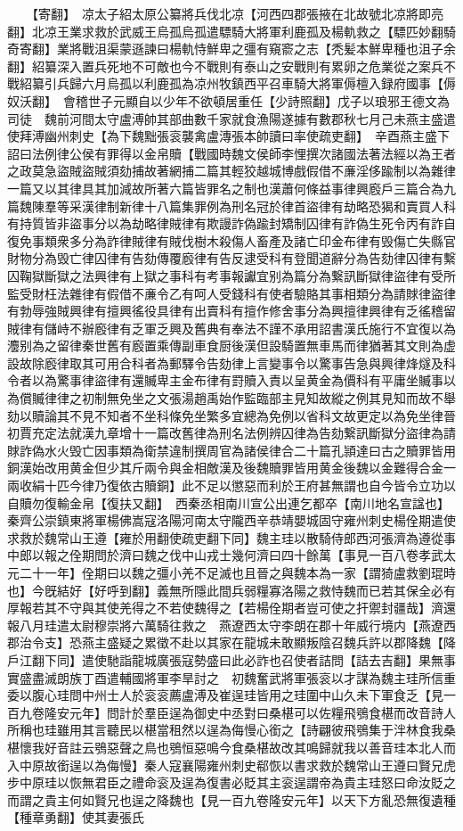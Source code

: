 　　【寄翻】　凉太子紹太原公纂將兵伐北凉【河西四郡張掖在北故號北凉將即亮翻】北凉王業求救於武威王烏孤烏孤遣驃騎大將軍利鹿孤及楊軌救之【驃匹妙翻騎奇寄翻】業將戰沮渠蒙遜諫曰楊軌恃鮮卑之彊有窺窬之志【秃髪本鮮卑種也沮子余翻】紹纂深入置兵死地不可敵也今不戰則有泰山之安戰則有累卵之危業從之案兵不戰紹纂引兵歸六月烏孤以利鹿孤為凉州牧鎮西平召車騎大將軍傉檀入録府國事【傉奴沃翻】　會稽世子元顯自以少年不欲頓居重任【少詩照翻】戊子以琅邪王德文為司徒　魏前河間太守盧溥帥其部曲數千家就食漁陽遂據有數郡秋七月己未燕主盛遣使拜溥幽州刺史【為下魏黜張衮襲禽盧漙張本帥讀曰率使疏吏翻】　辛酉燕主盛下詔曰法例律公侯有罪得以金帛贖【戰國時魏文侯師李悝撰次諸國法著法經以為王者之政莫急盜賊盜賊須劾捕故著網捕二篇其輕狡越城博戲假借不亷淫侈踰制以為雜律一篇又以其律具其加減故所著六篇皆罪名之制也漢蕭何條益事律興廏戶三篇合為九篇魏陳羣等采漢律制新律十八篇集罪例為刑名冠於律首盜律有劫略恐猲和賣買人科有持質皆非盜事分以為劫略律賊律有欺謾詐偽踰封矯制囚律有詐偽生死令丙有詐自復免事類衆多分為詐律賊律有賊伐樹木殺傷人畜產及諸亡印金布律有毁傷亡失縣官財物分為毁亡律囚律有告劾傳覆廏律有告反逮受科有登聞道辭分為告劾律囚律有繫囚鞠獄斷獄之法興律有上獄之事科有考事報讞宜别為篇分為繋訊斷獄律盜律有受所監受財枉法雜律有假借不亷令乙有呵人受錢科有使者驗賂其事相類分為請賕律盜律有勃辱強賊興律有擅興徭役具律有出賣科有擅作修舍事分為興擅律興律有乏徭稽留賊律有儲峙不辦廏律有乏軍乏興及舊典有奉法不謹不承用詔書漢氏施行不宜復以為灋别為之留律秦世舊有廏置乘傳副車食厨後漢但設騎置無車馬而律猶著其文則為虚設故除廏律取其可用合科者為郵驛令告劾律上言變事令以驚事告急與興律烽燧及科令者以為驚事律盜律有還贓卑主金布律有罸贖入責以呈黄金為價科有平庸坐贓事以為償贓律律之初制無免坐之文張湯趙禹始作監臨部主見知故縱之例其見知而故不舉劾以贖論其不見不知者不坐科條免坐繁多宜總為免例以省科文故更定以為免坐律晉初賈充定法就漢九章增十一篇改舊律為刑名法例辨囚律為告劾繋訊斷獄分盜律為請賕詐偽水火毁亡因事類為衛禁違制撰周官為諸侯律合二十篇孔頴達曰古之贖罪皆用銅漢始改用黄金但少其斤兩令與金相敵漢及後魏贖罪皆用黄金後魏以金難得合金一兩收絹十匹今律乃復依古贖銅】此不足以懲惡而利於王府甚無謂也自今皆令立功以自贖勿復輸金帛【復扶又翻】　西秦丞相南川宣公出連乞都卒【南川地名宣諡也】　秦齊公崇鎮東將軍楊佛嵩寇洛陽河南太守隴西辛恭靖嬰城固守雍州刺史楊佺期遣使求救於魏常山王遵【雍於用翻使疏吏翻下同】魏主珪以散騎侍郎西河張濟為遵從事中郎以報之佺期問於濟曰魏之伐中山戎士幾何濟曰四十餘萬【事見一百八卷孝武太元二十一年】佺期曰以魏之彊小羌不足滅也且晉之與魏本為一家【謂猗盧救劉琨時也】今旣結好【好呼到翻】義無所隱此間兵弱糧寡洛陽之救恃魏而已若其保全必有厚報若其不守與其使羌得之不若使魏得之【若楊佺期者豈可使之扞禦封疆哉】濟還報八月珪遣太尉穆崇將六萬騎往救之　燕遼西太守李朗在郡十年威行境内【燕遼西郡治令支】恐燕主盛疑之累徵不赴以其家在龍城未敢顯叛陰召魏兵許以郡降魏【降戶江翻下同】遣使馳詣龍城廣張寇勢盛曰此必詐也召使者詰問【詰去吉翻】果無事實盛盡滅朗族丁酉遣輔國將軍李旱討之　初魏奮武將軍張衮以才謀為魏主珪所信重委以腹心珪問中州士人於衮衮薦盧溥及崔逞珪皆用之珪圍中山久未下軍食乏【見一百九卷隆安元年】問計於羣臣逞為御史中丞對曰桑椹可以佐糧飛鴞食椹而改音詩人所稱也珪雖用其言聽民以椹當租然以逞為侮慢心銜之【詩翩彼飛鴞集于泮林食我桑椹懷我好音註云鴞惡聲之鳥也鴞恒惡鳴今食桑椹故改其鳴歸就我以善音珪本北人而入中原故銜逞以為侮慢】秦人寇襄陽雍州刺史郗恢以書求救於魏常山王遵曰賢兄虎步中原珪以恢無君臣之禮命衮及逞為復書必貶其主衮逞謂帝為貴主珪怒曰命汝貶之而謂之貴主何如賢兄也逞之降魏也【見一百九卷隆安元年】以天下方亂恐無復遺種【種章勇翻】使其妻張氏